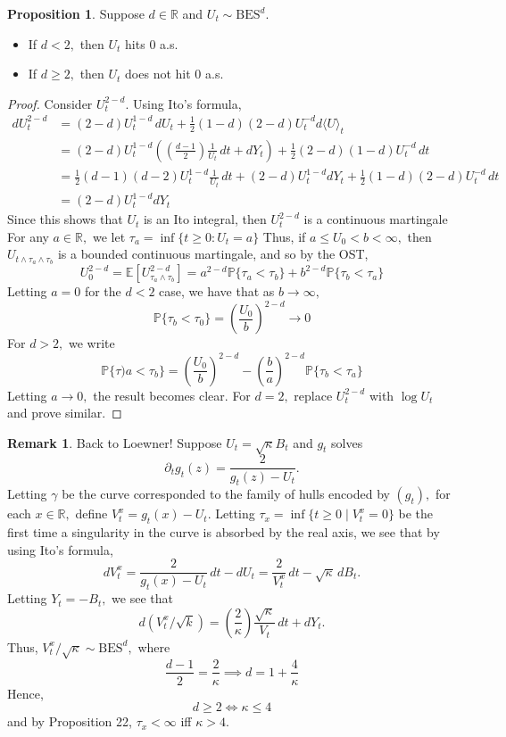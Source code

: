 \documentclass[10pt, oneside]{article}
\newcommand{\bbR}{\mathbb{R}}
\newcommand{\bbP}{\mathbb{P}}
\theoremstyle{definition}
\newtheorem{prop}{Proposition}
\newtheorem{rem}{Remark}
\newcommand{\bbE}{\mathbb{E}}
\newcommand{\bbP}{\mathbb{P}}
\newcommand{\bbR}{\mathbb{R}}
\begin{document}
\begin{prop}
    Suppose $d\in \bbR$ and $U_t \sim \text{BES}^d.$
    \begin{itemize}
        \item If $d < 2,$ then $U_t$ hits $0$ a.s.
        \item If $d\geq 2,$ then $U_t$ does not hit $0$ a.s.
    \end{itemize}
    \end{prop}
\begin{proof}
    Consider $U_t^{2-d}.$ Using Ito's formula, 
    \begin{align*}
        dU_t^{2-d} &= (2-d)U_t^{1-d}\,dU_t + \frac{1}{2}(1-d)(2-d)U_t^{-d}d\langle U
\rangle_t\\
&= (2-d)U_t^{1-d}\left((\frac{d-1}{2})\frac{1}{U_t}\,dt + dY_t\right) + \frac{1}{2}(2-d)(1-d)U_t^{-d}\,dt\\
&= \frac{1}{2}(d-1)(d-2)U_t^{1-d}\frac{1}{U_t}\,dt + (2-d)U_t^{1-d}dY_t + \frac{1}{2}(1-d)(2-d)U_t^{-d}\,dt\\
&= (2-d)U_t^{1-d}dY_t
    \end{align*}
    Since this shows that $U_t$ is an Ito integral, then $U_t^{2-d}$ is a continuous martingale For any $a\in \bbR,$ we let $\tau_a = \inf\{t \geq 0 : U_t = a\}$ Thus, if $a\leq U_0 < b < \infty,$ then $U_{t\wedge \tau_a \wedge \tau_b}$ is a bounded continuous martingale, and so by the OST,
    \[U_0^{2-d} = \bbE[U_{\tau_a \wedge \tau_b}^{2-d}] = a^{2-d}\bbP\{\tau_a < \tau_b\} + b^{2-d}\bbP\{\tau_b < \tau_a\}\] Letting $a = 0$ for the $d< 2$ case, we have that as $b\to \infty,$ 
    \[\bbP\{\tau_b < \tau_0\} = \left(\frac{U_0}{b}\right)^{2-d} \to 0\] For $d>2,$ we write 
    \[\bbP\{\tau)a < \tau_b\} = \left(\frac{U_0}{b}\right)^{2-d} - \left(\frac{b}{a}\right)^{2-d} \bbP\{\tau_b < \tau_a\}\] Letting $a\to 0,$ the result becomes clear. For $d = 2,$ replace $U_t^{2-d}$ with $\log U_t$ and prove similar.  
\end{proof}
\begin{rem}
    Back to Loewner! Suppose $U_t = \sqrt{\kappa}B_t$ and $g_t$ solves
    \[\partial_t g_t(z) = \frac{2}{g_t(z) - U_t}.\] Letting $\gamma$ be the curve corresponded to the family of hulls encoded by $(g_t),$ for each 
     $x\in \bbR,$  define $V_t^x = g_t(x) - U_t.$ Letting $\tau_x = \inf\{t \geq 0 \mid V_t^x = 0\}$ be the first time a singularity in the curve is absorbed by the real axis, we see that by using Ito's formula,
     \[dV_t^x = \frac{2}{g_t(x) - U_t}\,dt - dU_t = \frac{2}{V_t^x}\,dt - \sqrt{\kappa}\,dB_t.\] Letting $Y_t = -B_t,$ we see that 
     \[d(V_t^x/\sqrt{k}) = \left(\frac{2}{\kappa}\right) \frac{\sqrt{\kappa}}{V_t}\,dt + dY_t.\] Thus, $V_t^x/\sqrt{\kappa} \sim \text{BES}^d,$ where 
     \[\frac{d-1}{2} = \frac{2}{\kappa} \implies d = 1 + \frac{4}{\kappa}\] Hence, 
     \[d \geq 2 \iff \kappa \leq 4\] and by Proposition 22, $\tau_x < \infty$ iff $\kappa >4.$
\end{rem}
\end{document}
